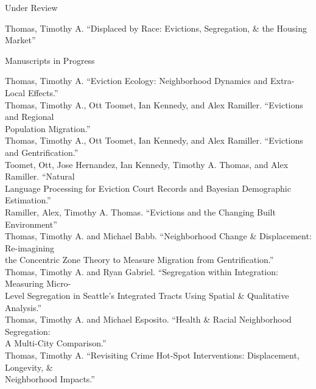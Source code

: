 \documentclass{resume} %
\begin{document}

% 

\begin{rSection}{Under Review}
\vspace{5mm}

Thomas, Timothy A. ``Displaced by Race: Evictions, Segregation, \& the Housing Market''

\vspace{5mm}
\end{rSection}


%

\begin{rSection}{Manuscripts in Progress}
\vspace{5mm}

Thomas, Timothy A. ``Eviction Ecology: Neighborhood Dynamics and Extra-Local Effects.''\\

Thomas, Timothy A., Ott Toomet, Ian Kennedy, and Alex Ramiller. ``Evictions and Regional\\ 
	\hspace*{.25in}Population Migration.''\\

Thomas, Timothy A., Ott Toomet, Ian Kennedy, and Alex Ramiller. ``Evictions and Gentrification.''\\ 

Toomet, Ott, Jose Hernandez, Ian Kennedy, Timothy A. Thomas, and Alex Ramiller. ``Natural\\
	\hspace*{.25in}Language Processing for Eviction Court Records and Bayesian Demographic Estimation.''\\ 

Ramiller, Alex, Timothy A. Thomas. ``Evictions and the Changing Built Environment''\\

Thomas, Timothy A. and Michael Babb. ``Neighborhood Change \& Displacement: Re-imagining\\
\hspace*{.25in}the Concentric Zone Theory to Measure Migration from Gentrification.''\\

Thomas, Timothy A. and Ryan Gabriel. ``Segregation within Integration: Measuring Micro-\\
	\hspace*{.25in}Level Segregation in Seattle’s Integrated Tracts Using Spatial \& Qualitative Analysis.''\\

Thomas, Timothy A. and Michael Esposito. ``Health \& Racial Neighborhood Segregation: \\
\hspace*{.25in}A Multi-City Comparison.''\\

Thomas, Timothy A. ``Revisiting Crime Hot-Spot Interventions: Displacement, Longevity, \& \\
	\hspace*{.25in}Neighborhood Impacts.''
\vspace{5mm}
\end{rSection}
\end{document}
